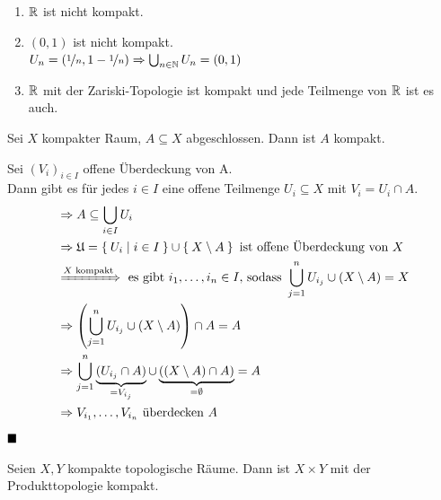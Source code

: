 \begin{beispiel}
    \begin{enumerate}[label=\arabic*)]
        \item $\mathbb{R}$ ist nicht kompakt.
        \item $(0,1)$ ist nicht kompakt.\\
              $U_n = (\nicefrac{1}{n}, 1-\nicefrac{1}{n}) \Rightarrow \bigcup_{n \in \mathbb{N}} U_n = (0,1)$
        \item $\mathbb{R}$ mit der Zariski-Topologie ist kompakt und jede 
              Teilmenge von $\mathbb{R}$ ist es auch.
    \end{enumerate}
\end{beispiel}

\begin{bemerkung}\label{abgeschlossenInKomaktIstKompakt}
    Sei $X$ kompakter Raum, $A \subseteq X$ abgeschlossen. Dann ist
    $A$ kompakt.
\end{bemerkung}

\begin{beweis}
    Sei $(V_{i})_{i \in I}$ offene Überdeckung von A.\\
    Dann gibt es für jedes $i \in I$ eine offene Teilmenge $U_{i} \subseteq X$ mit $V_{i}=U_{i} \cap A$.
    \begin{align*}
        &\Rightarrow A \subseteq \bigcup_{i \in I} U_i\\
        &\Rightarrow \mathfrak{U} = \Set{U_i | i \in I} \cup \Set{X \setminus A} \text{ ist offene Überdeckung von } X\\
        &\xRightarrow{X \text{ kompakt}} \text{ es gibt } i_1, \dots, i_n \in I\text{, sodass }\bigcup_{j=1}^n U_{i_j} \cup (X \setminus A) = X\\
        &\Rightarrow \left (\bigcup_{j=1}^n U_{i_j} \cup (X \setminus A)\right ) \cap A = A\\
        &\Rightarrow \bigcup_{j=1}^n \underbrace{(U_{i_j} \cap A)}_{= V_{i_j}} \cup \underbrace{((X \setminus A) \cap A)}_{= \emptyset} = A\\
        &\Rightarrow V_{i_1}, \dots, V_{i_n} \text{ überdecken } A
    \end{align*}
    $\qed$
\end{beweis}

\begin{bemerkung}\label{kompaktTimesKompaktIstKompakt}
    Seien $X, Y$ kompakte topologische Räume. Dann ist $X \times Y$
    mit der Produkttopologie kompakt.
\end{bemerkung}

